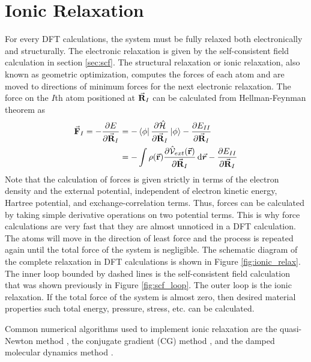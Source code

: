 \section{Ionic Relaxation}
For every DFT calculations, the system must be fully relaxed both electronically and structurally. The electronic relaxation is given by the self-consistent field calculation in section \ref{sec:scf}. The structural relaxation or ionic relaxation, also known as geometric optimization, computes the forces of each atom and are moved to  directions of minimum forces for the next electronic relaxation. The force on the $I$th atom  positioned at $\va{R}_I$ can be calculated from Hellman-Feynman theorem as \citep{Hellman1937,Feynman1939}
\begin{align}
    \va{F}_I =  - \pdv{E}{\va{R}_I} &= - \bra{\phi} \pdv{ \hat{\mathcal{H}}}{\va{R}_I} \ket{\phi} - \pdv{E_{II}}{\va{R}_I}  \\
    &= - \int \rho({\va{r}}) \pdv{\hat{\mathcal{V}}_{ext}(\va{r})}{\va{R}_I}  \dd{\va*{r}} - \pdv{E_{II}}{\va{R}_I}
\end{align}
Note that the calculation of forces is given strictly in terms of the electron density and the external potential, independent of electron kinetic energy, Hartree potential, and exchange-correlation terms. Thus, forces can be calculated by taking simple derivative operations on two potential terms. This is why force calculations are very fast that they are almost unnoticed in a  DFT calculation. The atoms will move in the direction of least force and the process is repeated again until the total force of the system is negligible. The schematic diagram of the complete relaxation in DFT calculations is shown in Figure \ref{fig:ionic_relax}. The inner loop bounded by dashed lines is the self-consistent field calculation that was shown previously in Figure \ref{fig:scf_loop}. The outer loop is the ionic relaxation. If the total force of the system is almost zero, then desired material properties such total energy, pressure, stress, etc. can be calculated.

Common numerical algorithms used to implement ionic relaxation are the quasi-Newton method \citep{Curtis2015}, the conjugate gradient (CG) method \citep{Dai1999}, and the damped molecular dynamics method \citep{Probert2003}. 



